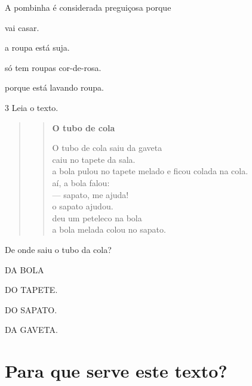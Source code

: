 A pombinha é considerada preguiçosa porque

\begin{escolha}
	\item vai casar.

	\item a roupa está suja.

	\item só tem roupas cor-de-rosa.

	\item porque está lavando roupa.
\end{escolha}

\pagebreak
\num{3} Leia o texto.

\begin{quote}
\begin{verse}
\textbf{O tubo de cola}

O tubo de cola saiu da gaveta\\
caiu no tapete da sala.\\
a bola pulou no tapete melado e ficou colada na cola.\\
aí, a bola falou:\\
--- sapato, me ajuda!\\
o sapato ajudou.\\
deu um peteleco na bola\\
a bola melada colou no sapato.
\end{verse}


\end{quote}

De onde saiu o tubo da cola?

\begin{escolha}
\item DA BOLA

\item DO TAPETE.

\item DO SAPATO.

\item DA GAVETA.
\end{escolha}

\chapter{Para que serve este texto?}

